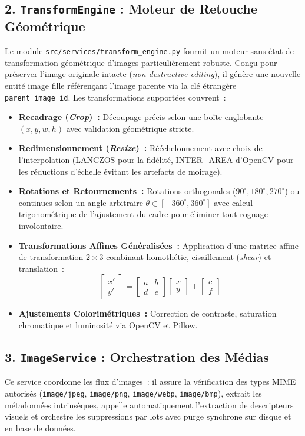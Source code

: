 \subsection{2. \texttt{TransformEngine} : Moteur de Retouche Géométrique}
Le module \texttt{src/services/transform\_engine.py} fournit un moteur sans état de transformation géométrique d'images particulièrement robuste. Conçu pour préserver l'image originale intacte (\textit{non-destructive editing}), il génère une nouvelle entité image fille référençant l'image parente via la clé étrangère \texttt{parent\_image\_id}. Les transformations supportées couvrent~:
\begin{itemize}
    \item \textbf{Recadrage (\textit{Crop})~:} Découpage précis selon une boîte englobante $(x, y, w, h)$ avec validation géométrique stricte.
    \item \textbf{Redimensionnement (\textit{Resize})~:} Rééchelonnement avec choix de l'interpolation (LANCZOS pour la fidélité, INTER\_AREA d'OpenCV pour les réductions d'échelle évitant les artefacts de moirage).
    \item \textbf{Rotations et Retournements~:} Rotations orthogonales ($90^\circ, 180^\circ, 270^\circ$) ou continues selon un angle arbitraire $\theta \in [-360^\circ, 360^\circ]$ avec calcul trigonométrique de l'ajustement du cadre pour éliminer tout rognage involontaire.
    \item \textbf{Transformations Affines Généralisées~:} Application d'une matrice affine de transformation $2 \times 3$ combinant homothétie, cisaillement (\textit{shear}) et translation~:
    \begin{equation}
    \begin{bmatrix} x' \\ y' \end{bmatrix} = \begin{bmatrix} a & b \\ d & e \end{bmatrix} \begin{bmatrix} x \\ y \end{bmatrix} + \begin{bmatrix} c \\ f \end{bmatrix}
    \end{equation}
    \item \textbf{Ajustements Colorimétriques~:} Correction de contraste, saturation chromatique et luminosité via OpenCV et Pillow.
\end{itemize}

\subsection{3. \texttt{ImageService} : Orchestration des Médias}
Ce service coordonne les flux d'images~: il assure la vérification des types MIME autorisés (\texttt{image/jpeg}, \texttt{image/png}, \texttt{image/webp}, \texttt{image/bmp}), extrait les métadonnées intrinsèques, appelle automatiquement l'extraction de descripteurs visuels et orchestre les suppressions par lots avec purge synchrone sur disque et en base de données.
